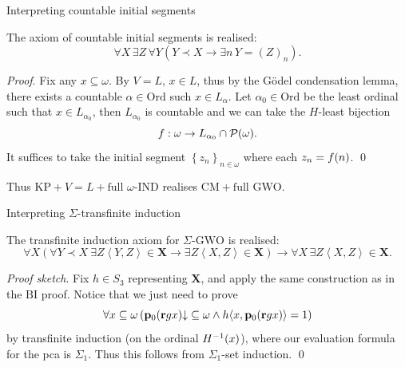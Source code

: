 \documentclass{beamer}
\newcommand{\tuple}[1]{\left\langle #1 \right\rangle}
\begin{document}
\begin{frame}{Interpreting countable initial segments}
  \begin{lemma}[$\mathrm{KP}^- + \Sigma_1\text{-}\mathrm{SI} + V = L$]
    The axiom of countable initial segments is realised:
    \[\forall X \, \exists Z \, \forall Y \left(Y \prec X \rightarrow \exists n \, Y = \left(Z\right)_n\right).\]
  \end{lemma}

  \vspace{0.6em}

  \emph{Proof}. Fix any $x \subseteq \omega$. By $V = L$, $x \in L$, thus by the G\"odel condensation lemma, there exists a countable $\alpha \in \mathrm{Ord}$ such $x \in L_\alpha$. Let $\alpha_0 \in \mathrm{Ord}$ be the least ordinal such that $x \in L_{\alpha_0}$, then $L_{\alpha_0}$ is countable and we can take the $H$-least bijection
  \[f : \omega \rightarrow L_{\alpha_0} \cap \mathcal{P}\mleft(\omega\mright).\]
  It suffices to take the initial segment $\left\{z_n\right\}_{n \in \omega}$ where each $z_n = f\mleft(n\mright)$. \qed

  \pause

  \vspace{1em}

  Thus $\mathrm{KP} + V = L + \text{full $\omega$-$\mathrm{IND}$}$ realises $\mathrm{CM} + \text{full $\mathrm{GWO}$}$.
\end{frame}

\begin{frame}{Interpreting $\Sigma$-transfinite induction}
  \begin{lemma}[$\mathrm{KP} + \Sigma_1\text{-}\mathrm{SI} + V = L$]
    The transfinite induction axiom for $\Sigma\text{-}\mathrm{GWO}$ is realised:
    \[\forall X \left(\forall Y \prec X \ \exists Z \tuple{Y, Z} \in \mathbf{X} \rightarrow \exists Z \tuple{X, Z} \in \mathbf{X}\right) \rightarrow \forall X \, \exists Z \tuple{X, Z} \in \mathbf{X}.\]
  \end{lemma}

  \vspace{0.6em}

  \emph{Proof sketch}. Fix $h \in S_3$ representing $\mathbf{X}$, and apply the same construction as in the $\mathrm{BI}$ proof. Notice that we just need to prove
  \[\forall x \subseteq \omega \left(\mathbf{p}_0 \mleft(\mathbf{r} gx\mright) {\downarrow} \subseteq \omega \land h {\tuple{x, \mathbf{p}_0 \mleft(\mathbf{r} gx\mright)}} = 1\right)\]
  by transfinite induction (on the ordinal $H^{-1}\mleft(x\mright)$), where our evaluation formula for the pca is $\Sigma_1$. Thus this follows from $\Sigma_1$-set induction. \qed
\end{frame}
\end{document}
